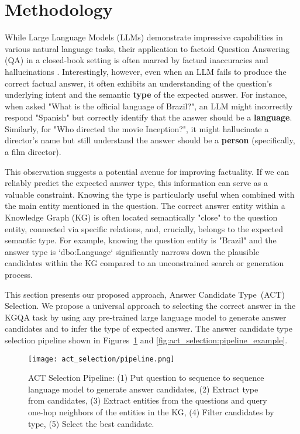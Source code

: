 \section{Methodology}
\label{sec:act_selection:methodology}

While Large Language Models (LLMs) demonstrate impressive capabilities in various natural language tasks, their application to factoid Question Answering (QA) in a closed-book setting is often marred by factual inaccuracies and hallucinations \cite{DBLP:conf/emnlp/RobertsRS20, lin-etal-2022-truthfulqa}. Interestingly, however, even when an LLM fails to produce the correct factual answer, it often exhibits an understanding of the question's underlying intent and the semantic \textbf{type} of the expected answer. For instance, when asked "What is the official language of Brazil?", an LLM might incorrectly respond "Spanish" but correctly identify that the answer should be a \textbf{language}. Similarly, for "Who directed the movie Inception?", it might hallucinate a director's name but still understand the answer should be a \textbf{person} (specifically, a film director).

This observation suggests a potential avenue for improving factuality. If we can reliably predict the expected answer type, this information can serve as a valuable constraint. Knowing the type is particularly useful when combined with the main entity mentioned in the question. The correct answer entity within a Knowledge Graph (KG) is often located semantically "close" to the question entity, connected via specific relations, and, crucially, belongs to the expected semantic type. For example, knowing the question entity is "Brazil" and the answer type is `dbo:Language` significantly narrows down the plausible candidates within the KG compared to an unconstrained search or generation process.

This section presents our proposed approach, Answer Candidate Type~(ACT) Selection. We propose a universal approach to selecting the correct answer in the KGQA task by using any pre-trained large language model to generate answer candidates and to infer the type of expected answer. The answer candidate type selection pipeline shown in Figures~\ref{fig:act_selection:pipeline} and \ref{fig:act_selection:pipeline_example}.

\begin{figure}[htb]
    \centering
    \texttt{[image: act\_selection/pipeline.png]}
    \caption{ACT Selection Pipeline: (1) Put question to sequence to sequence language model to generate answer candidates, (2) Extract type from candidates, (3) Extract entities from the questions and query one-hop neighbors of the entities in the KG, (4) Filter candidates by type, (5) Select the best candidate.}
    \label{fig:act_selection:pipeline}
\end{figure}

